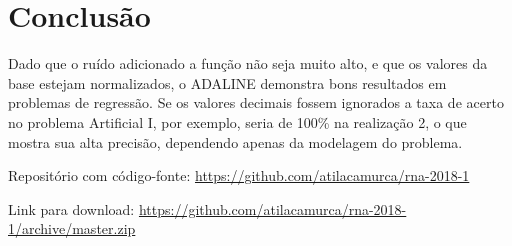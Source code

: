 \section{Conclusão}

Dado que o ruído adicionado a função não seja muito alto, e que os
valores da base estejam normalizados, o ADALINE demonstra bons
resultados em problemas de regressão. Se os valores decimais fossem
ignorados a taxa de acerto no problema Artificial I, por exemplo, seria
de 100\% na realização 2, o que mostra sua alta precisão, dependendo
apenas da modelagem do problema.

Repositório com código-fonte:
\url{https://github.com/atilacamurca/rna-2018-1}

Link para download:
\url{https://github.com/atilacamurca/rna-2018-1/archive/master.zip}
